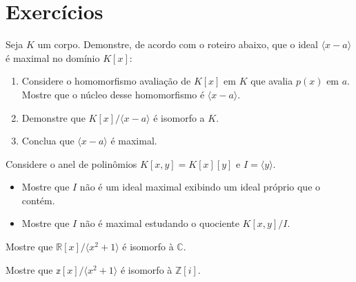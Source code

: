 \section{Exercícios}
\begin{exer}
    Seja $K$ um corpo. Demonstre, de acordo com o roteiro abaixo, que o ideal $\langle x-a\rangle$ é maximal no domínio $K[x]$:
    \begin{enumerate}[label=\alph*)]
        \item Considere o homomorfismo avaliação de $K[x]$ em $K$ que avalia $p(x)$ em $a$. Mostre que o núcleo desse homomorfismo é $\langle x-a\rangle$.
        \item Demonstre que $K[x]/\langle x-a\rangle$ é isomorfo a $K$.
        \item Conclua que $\langle x-a\rangle$ é maximal.
    \end{enumerate}
\end{exer}
\begin{exer}
    Considere o anel de polinômios $K[x, y]=K[x][y]$ e  $I=\langle y\rangle$.
    \begin{itemize}
        \item Mostre que $I$ não é um ideal maximal exibindo um ideal próprio que o contém.
        \item Mostre que $I$ não é maximal estudando o quociente $K[x, y]/I$.
    \end{itemize}
\end{exer}
\begin{exer}
Mostre que $\mathbb R[x]/\langle x^2+1\rangle$ é isomorfo à $\mathbb C$.
\end{exer}
\begin{exer}
    Mostre que $\mathbb z[x]/\langle x^2+1\rangle$ é isomorfo à $\mathbb Z[i]$.
\end{exer}